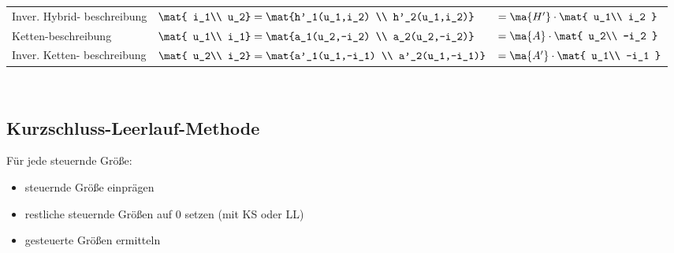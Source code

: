 \documentclass[fs, footer]{latex4ei}
\begin{document}
\begin{multicols*}{4}
\begin{tabular}{@{}p{1.3cm}|ll@{}}
		Inver. Hybrid- beschreibung & $\mat{ i_1\\ u_2} = \mat{h'_1(u_1,i_2) \\ h'_2(u_1,i_2)}$ & $= \ma{H'} \cdot \mat{ u_1\\ i_2 }$ \\ \mrule
		Ketten-beschreibung & $\mat{ u_1\\ i_1} = \mat{a_1(u_2,-i_2) \\ a_2(u_2,-i_2)}$ & $= \ma{A} \cdot \mat{ u_2\\ -i_2 }$\\ \mrule
		Inver. Ketten- beschreibung & $\mat{ u_2\\ i_2} = \mat{a'_1(u_1,-i_1) \\ a'_2(u_1,-i_1)}$ &  $= \ma{A'} \cdot \mat{ u_1\\ -i_1 }$

	\end{tabular}\\


	\subsection{Kurzschluss-Leerlauf-Methode}
	Für jede steuernde Größe:
	\begin{itemize}
		\item steuernde Größe einprägen
		\item restliche steuernde Größen auf 0 setzen (mit KS oder LL)
		\item gesteuerte Größen ermitteln
	\end{itemize}





\end{multicols*}
\end{document}
